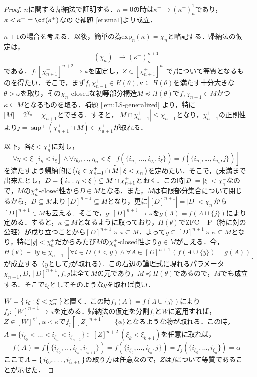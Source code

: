 \documentclass[a4paper]{bxjsarticle}
\begin{document}
\begin{proof}
 $n$に関する帰納法で証明する．$n = 0$の時は$\kappa^+ \longrightarrow (\kappa^+)^1_\kappa$であり，$\kappa < \kappa^+ = \cf(\kappa^+)$なので補題 \ref{er:small}より成立．

$n+1$の場合を考える．以後，簡単の為$\mathrm{exp}_n(\kappa) = \chi_n$と略記する．帰納法の仮定は，
\[
 (\chi_n)^+ \longrightarrow (\kappa^+)^{n+1}_\kappa
\]
である．$f: [\chi_{n+1}^+]^{n+2} \longrightarrow \kappa$を固定し，$Z \in [\chi_{n+1}^+]^{\kappa^+}$で$f$について等質となるものを得たい．そこで，まず$f, \chi_{n+1}^+ \in H(\theta), \kappa \subseteq H(\theta)$を満たす十分大きな$\theta > \omega$を取り，その$\chi_n^+$-closedな初等部分構造$M \preccurlyeq H(\theta)$で$f, \chi_{n+1}^+ \in M$かつ$\kappa \subseteq M$となるものを取る．補題 \ref{lem:LS-generalized} より，特に$|M| = 2^{\chi_n} = \chi_{n+1}$とできる．すると，$|M \cap \chi_{n+1}^+| \leq \chi_{n+1}$となり，$\chi_{n+1}^+$の正則性より$j = \sup^+(\chi_{n+1}^+ \cap M) \in \chi_{n+1}^+$が取れる．

 以下，各$\xi < \chi_{n}^+$に対し，
 \[
 \forall \eta < \xi \, [ i_\eta < i_\xi] \wedge \forall \eta_0, \dots, \eta_n < \xi \, [f(\{i_{\eta_0}, \dots, i_{\eta_n}, i_\xi\}) = f(\{i_{\eta_0}, \dots, i_{\eta_n}, j\})]
 \]
 を満たすよう帰納的に$\Braket{i_\xi \in \chi_{n+1}^+ \cap M | \xi < \chi_n^+}$を定めたい．そこで，$\xi$未満まで出来たとし，$D = \Set{ i_\eta : \eta < \xi} \subseteq M \cap \chi_{n+1}^+$とおく．この時$|D| = |\xi| < \chi_n^+$なので，$M$の$\chi_n^+$-closed性から$D \in M$となる．また，$M$は有限部分集合について閉じるから，$D \subseteq M$より$[D]^{n+1} \subseteq M$となり，更に$|[D]^{n+1}| = |D| < \chi_n^+$から$[D]^{n+1} \in M$も云える．そこで，$g : [D]^{n+1} \rightarrow \kappa$を$g(A) = f(A \cup \{j\})$により定める．すると，$\kappa \subseteq M$となるように取っており，$H(\theta)$で$\mathrm{ZFC}-\mathrm{P}$（特に対の公理）が成り立つことから$[D]^{n+1} \times \kappa \subseteq M$．よって$g \subseteq [D]^{n+1} \times \kappa \subseteq M$となり，特に$|g| < \chi_n^+$だからみたび$M$の$\chi_n^+$-closed性より$g \in M$が言える．今，
 \[
  H(\theta) \models
 \exists y \in \chi_{n+1}^+\;\left[ \forall i \in D\, (i < y) \wedge \forall A \in [D]^{n+1}\, (f(A \cup \{y\}) = g(A))\right]
 \]
 が成立する（$y$として$j$が取れる）．この右辺の論理式に現れるパラメータ$\chi_{n+1}^+, D, [D]^{n+1}, f, g$は全て$M$の元であり，$M \preccurlyeq H(\theta)$であるので，$M$でも成立する．そこで$i_\xi$としてそのような$y$を取れば良い．

 $W = \Set{ i_\xi : \xi < \chi_n^+}$と置く．この時$f_j(A) = f(A \cup \{j\})$により$f_j: [W]^{n+1} \rightarrow \kappa$を定める．帰納法の仮定を分割$f_j$と$W$に適用すれば，$Z \in [W]^{\kappa^+}, \alpha < \kappa$で$f_j[[Z]^{n+1}] = \{\alpha\}$となるような物が取れる．この時，$A = \{i_{\xi_0} < \dots < i_{\xi_n} < i_{\xi_{n+1}}\} \in [Z]^{n+2}\;(\xi_k < \xi_{k+1})$を任意に取れば，
 \[
  f(A) = f(\{i_{\xi_0}, \dots, i_{\xi_n}, i_{\xi_{n+1}}\})
 = f(\{i_{\xi_0}, \dots, i_{\xi_n}, j\})
 = f_j(\{i_{\xi_0}, \dots, i_{\xi_n}\}) = \alpha
 \]
 ここで$A = \set{i_{\xi_0}, \dots, i_{\xi_{n+1}}}$の取り方は任意なので，$Z$は$f$について等質であることが示せた．\mbox{}
\end{proof}
\end{document}
